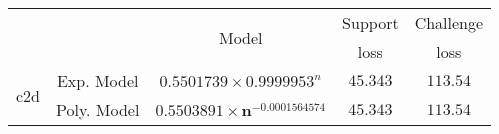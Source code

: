 \begin{tabular}{ccccc} 
\hline 
 &  & \multirow{2}{*}{Model} & Support & Challenge\tabularnewline 
 &  &  & loss  & loss\tabularnewline 
\hline 
\hline 
\multirow{2}{*}{c2d} & Exp. Model & $0.5501739\times 0.9999953^{n}$ & $45.343$ & $113.54$ \tabularnewline 
 & Poly. Model & $\mathbf{0.5503891\times n^{-0.0001564574}}$ & $\mathbf{45.343}$ & $\mathbf{113.54}$ \tabularnewline 
\hline 
\end{tabular} 

